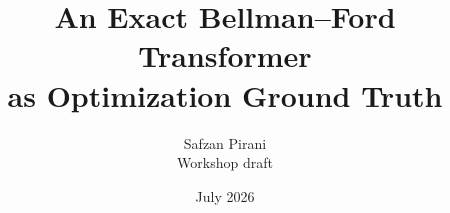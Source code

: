 \title{\vspace{-1.8em}\bfseries\color{navy}
An Exact Bellman--Ford Transformer\\[-0.1em]
as Optimization Ground Truth}
\author{\normalsize Safzan Pirani\\
\small Workshop draft}
\date{\small July 2026}